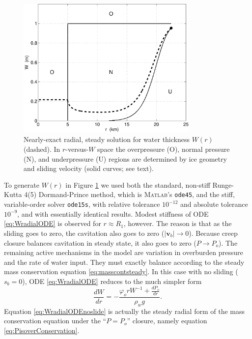 \documentclass[11pt,final]{amsart}%
\newcommand\bv{\mathbf{v}}
\newcommand\Matlab{\textsc{Matlab}\xspace}
\begin{document}
\begin{figure}[ht]
\includegraphics[width=3.5in,keepaspectratio=true]{exact-W-plot-onu}
\caption{Nearly-exact radial, steady solution for water thickness $W(r)$ (dashed).  In $r$-versus-$W$ space the overpressure (O), normal pressure (N), and underpressure (U) regions are determined by ice geometry and sliding velocity (solid curves; see text).}
\label{fig:Wexact}
\end{figure}

To generate $W(r)$ in Figure \ref{fig:Wexact} we used both the standard, non-stiff Runge-Kutta 4(5) Dormand-Prince method, which is \Matlab's \texttt{ode45}, and the stiff, variable-order solver \texttt{ode15s}, with relative tolerance $10^{-12}$ and absolute tolerance $10^{-9}$, and with essentially identical results.
Modest stiffness \citep{AscherPetzold} of ODE \eqref{eq:WradialODE} is observed for $r\approx R_1$, however.  The reason is that as the sliding goes to zero, the cavitation also goes to zero ($|\bv_b|\to 0$).  Because creep closure balances cavitation in steady state, it also goes to zero ($P\to P_o$).  The remaining active mechanisms in the model are variation in overburden pressure and the rate of water input.  They must exactly balance according to the steady mass conservation equation \eqref{eq:masscontsteady}.  In this case with no sliding ($s_b=0$), ODE \eqref{eq:WradialODE} reduces to the much simpler form
\begin{equation}
\frac{dW}{dr} = - \frac{\varphi_o r W^{-1} + \frac{dP_o}{dr}}{\rho_w g}. \label{eq:WradialODEnoslide}
\end{equation}
Equation \eqref{eq:WradialODEnoslide} is actually the steady radial form of the mass conservation equation under the ``$P=P_o$'' closure, namely equation \eqref{eq:PisoverConservation}.
\end{document}
